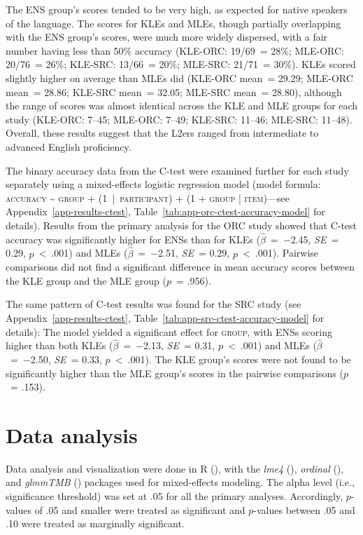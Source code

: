 The ENS group's scores tended to be very high, as expected for native speakers of the language. The scores for KLEs and MLEs, though partially overlapping with the ENS group's scores, were much more widely dispersed, with a fair number having less than 50\% accuracy (KLE-ORC: 19/69~= 28\%; MLE-ORC: 20/76~= 26\%; KLE-SRC: 13/66~= 20\%; MLE-SRC: 21/71~= 30\%). KLEs scored slightly higher on average than MLEs did (KLE-ORC mean~= 29.29; MLE-ORC mean~= 28.86; KLE-SRC mean~= 32.05; MLE-SRC mean~= 28.80), although the range of scores was almost identical across the KLE and MLE groups for each study (KLE-ORC: 7--45; MLE-ORC: 7--49; KLE-SRC: 11--46; MLE-SRC: 11--48). Overall, these results suggest that the L2ers ranged from intermediate to advanced English proficiency.

The binary accuracy data from the C-test were examined further for each study separately using a mixed-effects logistic regression model (model formula: \textsc{accuracy \~{} group + (1~|~participant) + (1 + group | item)}---see Appendix~\ref{app-results-ctest}, Table~\ref{tab:app-orc-ctest-accuracy-model} for details). Results from the primary analysis for the ORC study showed that C-test accuracy was significantly higher for ENSs than for KLEs ($\hat{\beta}$~=~−2.45, \textit{SE}~= 0.29, $p$~<~.001) and MLEs ($\hat{\beta}$~=~−2.51, \textit{SE}~= 0.29, $p$~<~.001). Pairwise comparisons did not find a significant difference in mean accuracy scores between the KLE group and the MLE group ($p$~= .956).

The same pattern of C-test results was found for the SRC study (see Appendix~\ref{app-results-ctest}, Table~\ref{tab:app-src-ctest-accuracy-model} for details): The model yielded a significant effect for \textsc{group}, with ENSs scoring higher than both KLEs ($\hat{\beta}$~=~−2.13, \textit{SE}~= 0.31, $p$~<~.001) and MLEs ($\hat{\beta}$~=~−2.50, \textit{SE}~= 0.33, $p$~<~.001). The KLE group's scores were not found to be significantly higher than the MLE group's scores in the pairwise comparisons ($p$~= .153).

\section{Data analysis}\label{stu-analysis}

Data analysis and visualization were done in R (\cite{rcoreteam2023}), with the \textit{lme4} (\cite{bates.etal2015}), \textit{ordinal} (\cite{christensen2019}), and \textit{glmmTMB} (\cite{brooks.etal2017}) packages used for mixed-effects modeling. The alpha level (i.e., significance threshold) was set at .05 for all the primary analyses. Accordingly, $p$-values of .05 and smaller were treated as significant and $p$-values between .05 and .10 were treated as marginally significant. 

